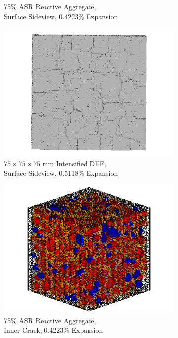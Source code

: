 \begin{figure}[ht]
\begin{subfigure}{.5\textwidth}
      \caption{75\% ASR Reactive Aggregate, \\Surface Sideview, 0.4223\% Expansion}
      \end{subfigure}%
    \begin{subfigure}{.5\textwidth}
      \centering
      \includegraphics[width=.8\linewidth]{Files/exp_3D/DEF/A30X-5C_3_3ds.png}
      \caption{$75 \times 75 \times 75$ mm Intensified DEF, \\ Surface Sideview, 0.5118\% Expansion}
      \end{subfigure}
      \begin{subfigure}{.5\textwidth}
        \centering
        \includegraphics[width=.8\linewidth]{Files/exp_3D/ASR/A30P75_3_c.png}
        \caption{75\% ASR Reactive Aggregate, \\Inner Crack, 0.4223\% Expansion}
        \end{subfigure}%
      \begin{subfigure}{.5\textwidth}
        \centering

\end{subfigure}
\end{figure}

